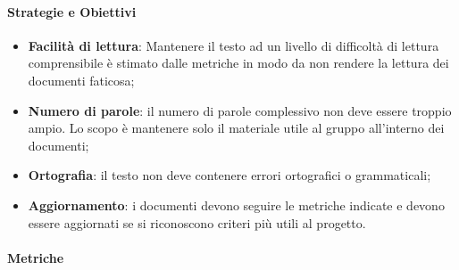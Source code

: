             \paragraph{Strategie e Obiettivi}
            \begin{itemize}
                \item \textbf{Facilità di lettura}: Mantenere il testo ad un livello di difficoltà di lettura comprensibile è stimato dalle metriche in modo da non rendere la lettura dei documenti faticosa;
                \item \textbf{Numero di parole}: il numero di parole complessivo non deve essere troppio ampio. Lo scopo è mantenere solo il materiale utile al gruppo all'interno dei documenti;
                \item \textbf{Ortografia}: il testo non deve contenere errori ortografici o grammaticali;
                \item \textbf{Aggiornamento}: i documenti devono seguire le metriche indicate e devono essere aggiornati se si riconoscono criteri più utili al progetto.
            \end{itemize}
    \newpage
            \paragraph{Metriche}
            
            \hphantom{}
         \def\productquality{
                            {   Gunning's fog index,
                                $0.4*(\frac{ Parole}{Frasi} + 100* \frac{Complesse}{ Frasi})$, 
                                $ \geq 16$,
                                $ \geq 12 $
                            },
                            {   Gulpease index,
                                $89 + (300*Frasi - 10*\frac{Lettere}{Parole}$, 
                                $40 < IG \leq 100$,
                                $80 < IG \leq 100$
                            },
                            {   Correttezza ortografica,
                                numero totale di errori, 
                                0,
                                0
                            },
                        }
                    
                    
